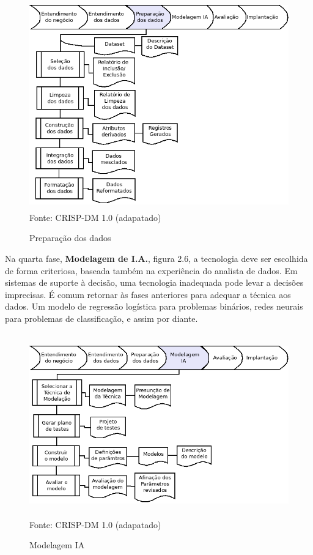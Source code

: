 \begin{figure}[!ht]
\centering
\caption{Preparação dos dados}
\vspace{1mm}
\includegraphics[width=120mm, height=90mm]{Figuras/Cronograma/PreparaDados.png}\\
\tiny Fonte: CRISP-DM 1.0 (adapatado)
\end{figure}

\vspace{0.9cm}

Na quarta fase, \textbf{Modelagem de I.A.}, figura 2.6, a tecnologia deve ser escolhida de forma criteriosa, baseada também na experiência do analista de dados. 
Em sistemas de suporte à decisão, uma tecnologia inadequada pode levar a decisões imprecisas. É comum retornar às fases anteriores para adequar a técnica aos dados. 
Um modelo de regressão logística para problemas binários, redes neurais para problemas de classificação, e assim por diante.

\begin{figure}[!ht]
\centering
\caption{Modelagem IA}
\vspace{1mm}
\includegraphics[width=120mm, height=79mm]{Figuras/Cronograma/Model_IA.png}\\
\tiny Fonte: CRISP-DM 1.0 (adapatado)
\end{figure}

